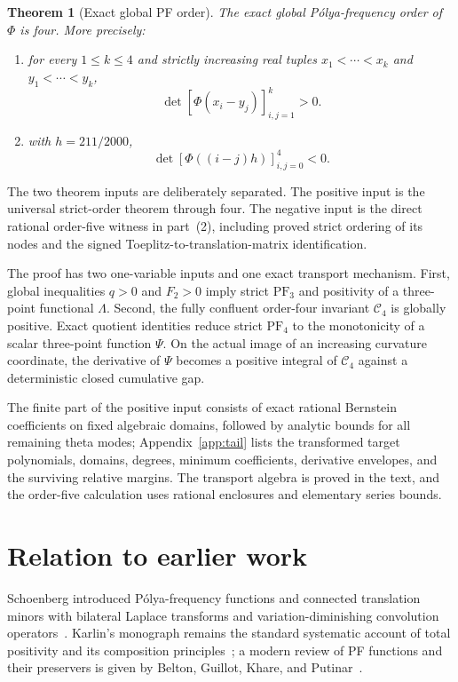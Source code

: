 \documentclass[11pt]{article}
\newtheorem{theorem}{Theorem}[section]
\theoremstyle{remark}
\newcommand{\Cfour}{\mathcal{C}_4}
\newcommand{\PF}{\mathrm{PF}}
\newcommand{\appref}[1]{Appendix~\ref{#1}}
\numberwithin{equation}{section}
\begin{document}
\begin{theorem}[Exact global PF order]\label{thm:main}
The exact global P\'olya-frequency order of \(\Phi\) is four. More precisely:
\begin{enumerate}
\item for every \(1\leq k\leq4\) and strictly increasing real tuples
\(x_1<\cdots<x_k\) and \(y_1<\cdots<y_k\),
\[
 \det[\Phi(x_i-y_j)]_{i,j=1}^k>0.
\]
\item with \(h=211/2000\),
\[
 \det[\Phi((i-j)h)]_{i,j=0}^4<0.
\]
\end{enumerate}
\end{theorem}

The two theorem inputs are deliberately separated. The positive input is the
universal strict-order theorem through four. The negative input is the direct
rational order-five witness in part~(2), including proved strict ordering of
its nodes and the signed Toeplitz-to-translation-matrix identification.

The proof has two one-variable inputs and one exact transport
mechanism. First, global inequalities \(q>0\) and \(F_2>0\) imply strict
\(\PF_3\) and positivity of a three-point functional \(\Lambda\). Second, the
fully confluent order-four invariant \(\Cfour\) is globally positive. Exact
quotient identities reduce strict \(\PF_4\) to the monotonicity of a scalar
three-point function \(\Psi\). On the actual image of an increasing curvature
coordinate, the derivative of \(\Psi\) becomes a positive integral of
\(\Cfour\) against a deterministic closed cumulative gap.

The finite part of the positive input consists of exact rational Bernstein
coefficients on fixed algebraic domains, followed by analytic bounds for all
remaining theta modes; \appref{app:tail} lists the transformed target
polynomials, domains, degrees, minimum coefficients, derivative envelopes,
and the surviving relative margins. The transport algebra is proved in the
text, and the order-five
calculation uses rational enclosures and elementary series bounds.
\section{Relation to earlier work}\label{sec:related-work}

Schoenberg introduced P\'olya-frequency functions and connected translation
minors with bilateral Laplace transforms and variation-diminishing convolution
operators~\cite{schoenberg-ii,belton}. Karlin's monograph remains the
standard systematic account of total positivity and its composition
principles~\cite{karlin}; a modern review of PF functions and their preservers
is given by Belton, Guillot, Khare, and Putinar~\cite{belton}.
\end{document}
